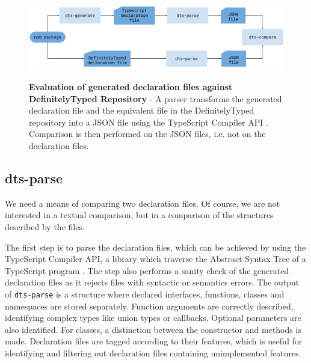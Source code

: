 \documentclass[a4paper,english,cleveref, autoref]{lipics-v2019}
\begin{document}
 
\begin{figure}[tp]
    \begin{centering}
        {\includegraphics[width=1\textwidth]{evaluation-diagram.pdf}}
        \caption[Evaluation against DefinitelyTyped Repository]{\textbf{Evaluation of generated declaration files against DefinitelyTyped Repository} - A parser transforms the generated declaration file and the equivalent file in the DefinitelyTyped repository into a JSON file using the TypeScript Compiler API \cite{typescript-compiler-api}. Comparison is then performed on the JSON files, i.e. not on the declaration files.}
        \label{fig:evaluation-diagram}
    \end{centering}
\end{figure}

\subsection{dts-parse}
We need a means of comparing two declaration files. Of
course, we are not interested in a textual comparison, but in a
comparison of the structures described by the files.

The first step is to parse the declaration files, which can be
achieved by using the TypeScript Compiler API, a library which traverse the
Abstract Syntax Tree of a TypeScript program
\cite{typescript-compiler-api}. 
The step also performs a sanity check of the generated declaration
files as it rejects files with syntactic or semantics errors.
The output of \texttt{dts-parse} is a structure where declared
{interfaces}, {functions}, {classes} and
{namespaces} are stored separately. Function arguments are
correctly described, identifying complex types like union types or
callbacks. Optional parameters are also identified. For
{classes}, a distinction between the constructor and methods
is made. Declaration files are tagged according to their features, which is useful for identifying and filtering out declaration files containing unimplemented features.
\end{document}
